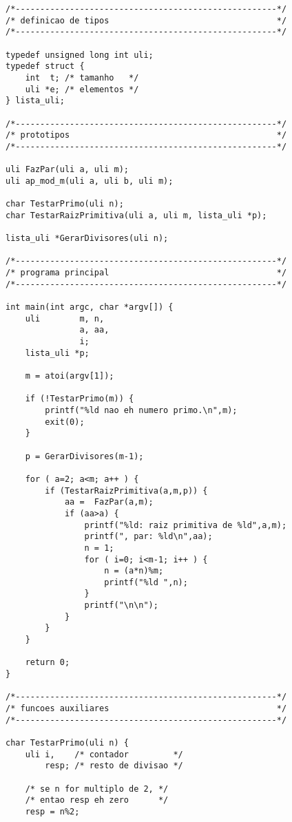 \documentclass[a4paper,12pt,oneside,onecolumn]{uerj}
\begin{document}
\begin{verbatim}
/*-----------------------------------------------------*/
/* definicao de tipos                                  */
/*-----------------------------------------------------*/

typedef unsigned long int uli;
typedef struct {
    int  t; /* tamanho   */
    uli *e; /* elementos */
} lista_uli;

/*-----------------------------------------------------*/
/* prototipos                                          */
/*-----------------------------------------------------*/

uli FazPar(uli a, uli m);
uli ap_mod_m(uli a, uli b, uli m);

char TestarPrimo(uli n);
char TestarRaizPrimitiva(uli a, uli m, lista_uli *p);

lista_uli *GerarDivisores(uli n);

/*-----------------------------------------------------*/
/* programa principal                                  */
/*-----------------------------------------------------*/

int main(int argc, char *argv[]) {
    uli        m, n,
               a, aa,
               i;
    lista_uli *p;

    m = atoi(argv[1]);

    if (!TestarPrimo(m)) {
        printf("%ld nao eh numero primo.\n",m);
        exit(0);
    }

    p = GerarDivisores(m-1);

    for ( a=2; a<m; a++ ) {
        if (TestarRaizPrimitiva(a,m,p)) {
            aa =  FazPar(a,m);
            if (aa>a) {
                printf("%ld: raiz primitiva de %ld",a,m);
                printf(", par: %ld\n",aa);
                n = 1;
                for ( i=0; i<m-1; i++ ) {
                    n = (a*n)%m;
                    printf("%ld ",n);
                }
                printf("\n\n");
            }
        }
    }

    return 0;
}

/*-----------------------------------------------------*/
/* funcoes auxiliares                                  */
/*-----------------------------------------------------*/

char TestarPrimo(uli n) {
    uli i,    /* contador         */
        resp; /* resto de divisao */

    /* se n for multiplo de 2, */
    /* entao resp eh zero      */
    resp = n%2;


\end{verbatim}
\end{document}
